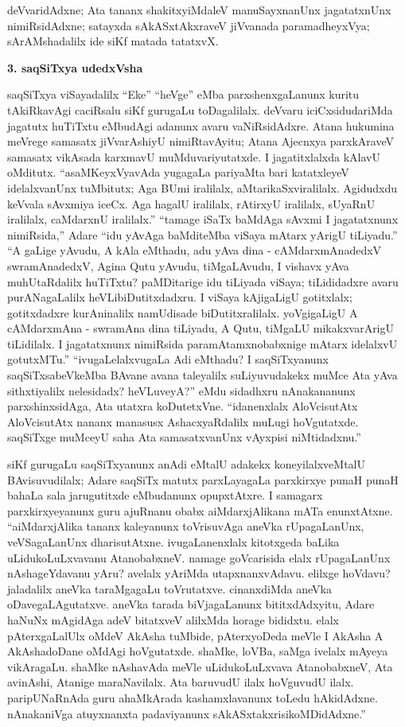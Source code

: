 deVvaridAdxne; Ata tananx shakitxyiMdaleV manuSayxnanUnx jagatatxnUnx nimiRsidAdxne; satayxda sAkASxtAkxraveV jiVvanada paramadheyxVya; sArAMshadalilx ide siKf matada tatatxvX.

\smallskip
\begin{center}
{\Large\bf 3. saqSiTxya udedxVsha}
\end{center}

saqSiTxya viSayadalilx ``Eke'' ``heVge'' eMba parxshenxgaLanunx kuritu tAkiRkavAgi caciRsalu siKf gurugaLu toDagalilalx. deVvaru iciCxsidudariMda jagatutx huTiTxtu eMbudAgi adanunx avaru vaNiRsidAdxre. Atana hukumina meVrege samasatx jiVvarAshiyU nimiRtavAyitu; Atana Ajecnxya parxkAraveV samasatx vikAsada karxmavU muMduvariyutatxde. I jagatitxlalxda kAlavU oMditutx. ``asaMKeyxVyavAda yugagaLa pariyaMta bari katatxleyeV idelalxvanUnx tuMbitutx; Aga BUmi iralilalx, aMtarikaSxviralilalx. Agidudxdu keVvala sAvxmiya iceCx. Aga hagalU iralilalx, rAtirxyU iralilalx, sUyaRnU iralilalx, caMdarxnU iralilalx.'' ``tamage iSaTx baMdAga sAvxmi I jagatatxnunx nimiRsida,'' Adare ``idu yAvAga baMditeMba viSaya mAtarx yArigU tiLiyadu.'' ``A gaLige yAvudu, A kAla eMthadu, adu yAva dina - cAMdarxmAnadedxV swramAnadedxV, Agina Qutu yAvudu, tiMgaLAvudu, I vishavx yAva muhUtaRdalilx huTiTxtu? paMDitarige idu tiLiyada viSaya; tiLididadxre avaru purANagaLalilx heVLibiDutitxdadxru. I viSaya kAjigaLigU gotitxlalx; gotitxdadxre kurAninalilx namUdisade biDutitxralilalx. yoVgigaLigU A cAMdarxmAna - swramAna dina tiLiyadu, A Qutu, tiMgaLU mikakxvarArigU tiLidilalx. I jagatatxnunx nimiRsida paramAtamxnobabxnige mAtarx idelalxvU gotutxMTu.'' ``ivugaLelalxvugaLa Adi eMthadu? I saqSiTxyanunx saqSiTxsabeVkeMba BAvane avana taleyalilx suLiyuvudakekx muMce Ata yAva sithxtiyalilx nelesidadx? heVLuveyA?'' eMdu sidadhxru nAnakananunx parxshinxsidAga, Ata utatxra koDutetxVne. ``idanenxlalx AloVcisutAtx AloVcisutAtx nananx manasusx AshacxyaRdalilx muLugi hoVgutatxde. saqSiTxge muMceyU saha Ata samasatxvanUnx vAyxpisi niMtidadxnu.''

siKf gurugaLu saqSiTxyanunx anAdi eMtalU adakekx koneyilalxveMtalU BAvisuvudilalx; Adare saqSiTx matutx parxLayagaLa parxkirxye punaH punaH bahaLa sala jarugutitxde eMbudanunx opupxtAtxre. I samagarx parxkirxyeyanunx guru ajuRnanu obabx aiMdarxjAlikana mATa enunxtAtxne. ``aiMdarxjAlika tananx kaleyanunx toVrisuvAga aneVka rUpagaLanUnx, veVSagaLanUnx dharisutAtxne. ivugaLanenxlalx kitotxgeda baLika uLidukoLuLxvavanu AtanobabxneV. namage goVcarisida elalx rUpagaLanUnx nAshageYdavanu yAru? avelalx yAriMda utapxnanxvAdavu. elilxge hoVdavu? jaladalilx aneVka taraMgagaLu toVrutatxve. cinanxdiMda aneVka oDavegaLAgutatxve. aneVka tarada biVjagaLanunx bititxdAdxyitu, Adare haNuNx mAgidAga adeV bitatxveV alilxMda horage bididxtu. elalx pAterxgaLalUlx oMdeV AkAsha tuMbide, pAterxyoDeda meVle I AkAsha A AkAshadoDane oMdAgi hoVgutatxde. shaMke, loVBa, saMga ivelalx mAyeya vikAragaLu. shaMke nAshavAda meVle uLidukoLuLxvava AtanobabxneV, Ata avinAshi, Atanige maraNavilalx. Ata baruvudU ilalx hoVguvudU ilalx. paripUNaRnAda guru ahaMkArada kashamxlavanunx toLedu hAkidAdxne. nAnakaniVga atuyxnanxta padaviyanunx sAkASxtakxrisikoMDidAdxne.''

